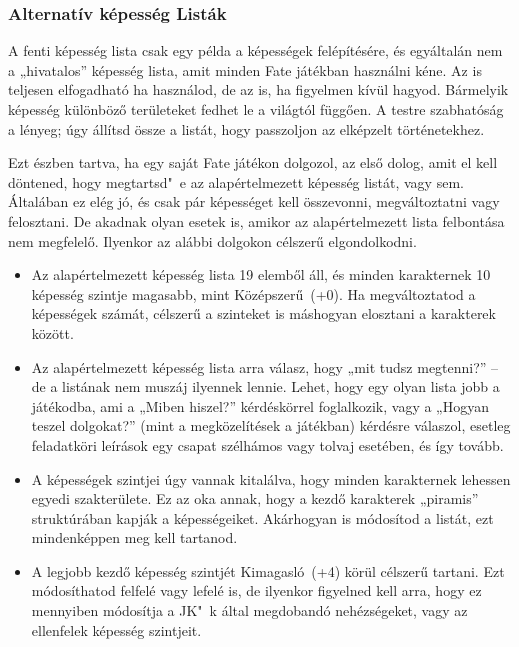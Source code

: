 \label{Alternatív képesség Listák}
\subsubsection{Alternatív képesség Listák}

A fenti képesség lista csak egy példa a képességek felépítésére, és egyáltalán nem a „hivatalos” képesség lista, amit minden Fate játékban használni kéne. Az is teljesen elfogadható ha használod, de az is, ha figyelmen kívül hagyod. Bármelyik képesség különböző területeket fedhet le a világtól függően. A testre szabhatóság a lényeg; úgy állítsd össze a listát, hogy passzoljon az elképzelt történetekhez.

Ezt észben tartva, ha egy saját Fate játékon dolgozol, az első dolog, amit el kell döntened, hogy megtartsd"~e az alapértelmezett képesség listát, vagy sem. Általában ez elég jó, és csak pár képességet kell összevonni, megváltoztatni vagy felosztani. De akadnak olyan esetek is, amikor az alapértelmezett lista felbontása nem megfelelő. Ilyenkor az alábbi dolgokon célszerű elgondolkodni.

\begin{itemize}
    \item Az alapértelmezett képesség lista 19 elemből áll, és minden karakternek 10 képesség szintje magasabb, mint Középszerű~(+0). Ha megváltoztatod a képességek számát, célszerű a szinteket is máshogyan elosztani a karakterek között.
    \item Az alapértelmezett képesség lista arra válasz, hogy „mit tudsz megtenni?” -- de a listának nem muszáj ilyennek lennie. Lehet, hogy egy olyan lista jobb a játékodba, ami a „Miben hiszel?” kérdéskörrel foglalkozik, vagy a „Hogyan teszel dolgokat?” (mint a megközelítések a  játékban) kérdésre válaszol, esetleg feladatköri leírások egy csapat szélhámos vagy tolvaj esetében, és így tovább.
    \item A képességek szintjei úgy vannak kitalálva, hogy minden karakternek lehessen egyedi szakterülete. Ez az oka annak, hogy a kezdő karakterek „piramis” struktúrában kapják a képességeiket. Akárhogyan is módosítod a listát, ezt mindenképpen meg kell tartanod.
    \item A legjobb kezdő képesség szintjét Kimagasló~(+4) körül célszerű tartani. Ezt módosíthatod felfelé vagy lefelé is, de ilyenkor figyelned kell arra, hogy ez mennyiben módosítja a JK"~k által megdobandó nehézségeket, vagy az ellenfelek képesség szintjeit.
\end{itemize}

